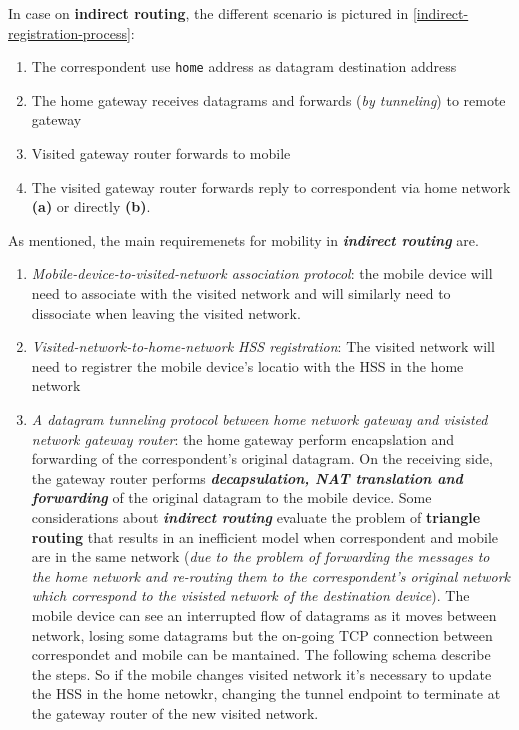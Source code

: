 \documentclass[10pt,a4paper]{report}
\theoremstyle{definition}
\begin{document}
In case on \textbf{indirect routing}, the different scenario is pictured in \ref{indirect-registration-process}:


\begin{enumerate}
	\item 
	The correspondent use \texttt{home} address as datagram destination address
	\item 
	The home gateway receives datagrams and forwards (\textit{by tunneling}) to remote gateway
	\item 
	Visited gateway router forwards to mobile
	\item 
	The visited gateway router forwards reply to correspondent via home network \textbf{(a)} or directly \textbf{(b)}.
\end{enumerate}

As mentioned, the main requiremenets for mobility in \textit{\textbf{indirect routing}} are.
\begin{enumerate}

	\item 
	\textit{Mobile-device-to-visited-network association protocol}: the mobile device will need to associate with the visited network and will similarly need to dissociate when leaving the visited network.
	\item 
	\textit{Visited-network-to-home-network HSS registration}: The visited network will need to registrer the mobile device's locatio with the HSS in the home network
	\item 
	\textit{A datagram tunneling protocol between home network gateway and visisted network gateway router}: the home gateway perform encapslation and forwarding of the correspondent's original datagram. On the receiving side, the gateway router performs \textit{\textbf{decapsulation, NAT translation and forwarding}} of the original datagram to the mobile device.
	Some considerations about \textit{\textbf{indirect routing}} evaluate the problem of \textbf{triangle routing} that results in an inefficient model when correspondent and mobile are in the same network (\textit{due to the problem of forwarding the messages to the home network and re-routing them to the correspondent's original network which correspond to the visisted network of the destination device}).
	The mobile device can see an interrupted flow of datagrams as it moves between network, losing some datagrams but the on-going TCP connection between correspondet and mobile can be mantained. The following schema describe the steps. So if the mobile changes visited network it's necessary to update the HSS in the home netowkr, changing the tunnel endpoint to terminate at the gateway router of the new visited network.
\end{enumerate}
\end{document}
